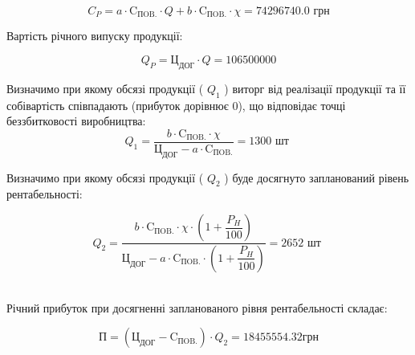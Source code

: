\documentclass[a4paper,14pt]{extreport}
\begin{document}
\[ C_P = a\cdot \text{C}_{\text{ПOB.}} \cdot Q + b\cdot \text{C}_{\text{ПOB.}} \cdot \chi = 74 296 740.0 \text{ грн}\]

Вартість річного випуску продукції:

\[ Q_P = \text{Ц}_{\text{ДОГ}} \cdot Q =  106 500 000\]

Визначимо при якому обсязі продукції ( $Q_1$ ) виторг від реалізації продукції та
її собівартість співпадають (прибуток дорівнює 0), що відповідає точці
беззбитковості виробництва:
\[ Q_1 = \dfrac{b\cdot \text{C}_{\text{ПOB.}} \cdot \chi}{\text{Ц}_{\text{ДОГ}}-a\cdot \text{C}_{\text{ПOB.}}}  = 1300 \text{ шт }\]

Визначимо при якому обсязі продукції ( $Q_2$ ) буде досягнуто запланований
рівень рентабельності:

\[ Q_2 = \dfrac{b\cdot \text{C}_{\text{ПOB.}} \cdot \chi \cdot \left(1+\dfrac{P_H}{100}\right)}{\text{Ц}_{\text{ДОГ}   }-a\cdot \text{C}_{\text{ПOB.}} \cdot \left(1+\dfrac{P_H}{100}\right)}  = 2652 \text{ шт }\]\

Річний прибуток при досягненні запланованого рівня рентабельності
складає:

\[ \text{П} = (\text{Ц}_{\text{ДОГ}} - \text{C}_{\text{ПOB.}})\cdot Q_{2} = 18 455 554.32 \text{грн}\]

\begin{figure}[h!]
\centering
{}
\end{figure}


\clearpage
\newpage
\end{document}

